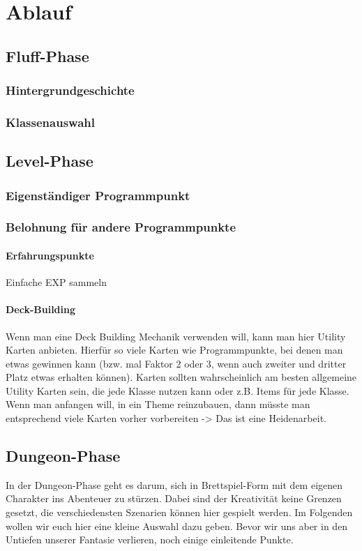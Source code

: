 \documentclass[letterpaper,twocolumn,openany,nodeprecatedcode]{dndbook}
\begin{document}
\chapter{Ablauf}

\section{Fluff-Phase}

\subsection{Hintergrundgeschichte}

\subsection{Klassenauswahl}

\section{Level-Phase}
\subsection{Eigenständiger Programmpunkt}
\subsection{Belohnung für andere Programmpunkte}
\subsubsection{Erfahrungspunkte}
Einfache EXP sammeln

\subsubsection{Deck-Building}
Wenn man eine Deck Building Mechanik verwenden will, kann man hier Utility Karten anbieten.
Hierfür so viele Karten wie Programmpunkte, bei denen man etwas gewinnen kann (bzw. mal Faktor 2 oder 3, wenn auch zweiter und dritter Platz etwas erhalten können). 
Karten sollten wahrscheinlich am besten allgemeine Utility Karten sein, die jede Klasse nutzen kann oder z.B. Items für jede Klasse.
Wenn man anfangen will, in ein Theme reinzubauen, dann müsste man entsprechend viele Karten vorher vorbereiten -> Das ist eine Heidenarbeit. 

\section{Dungeon-Phase}
In der Dungeon-Phase geht es darum, sich in Brettspiel-Form mit dem eigenen Charakter ins Abenteuer zu stürzen.
Dabei sind der Kreativität keine Grenzen gesetzt, die verschiedensten Szenarien können hier
gespielt werden. Im Folgenden wollen wir euch hier eine kleine Auswahl dazu geben.
Bevor wir uns aber in den Untiefen unserer Fantasie verlieren, noch einige einleitende Punkte.
\end{document}
